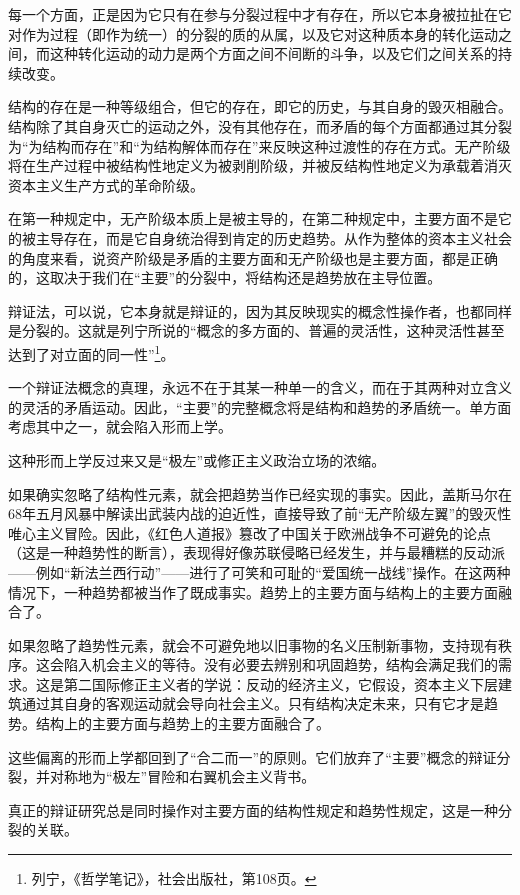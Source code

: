 \documentclass[fontset=fandol, a4paper, 12pt, twoside]{ctexart}
\begin{document}
每一个方面，正是因为它只有在参与分裂过程中才有存在，所以它本身被拉扯在它对作为过程（即作为统一）的分裂的质的从属，以及它对这种质本身的转化运动之间，而这种转化运动的动力是两个方面之间不间断的斗争，以及它们之间关系的持续改变。

结构的存在是一种等级组合，但它的存在，即它的历史，与其自身的毁灭相融合。结构除了其自身灭亡的运动之外，没有其他存在，而矛盾的每个方面都通过其分裂为“为结构而存在”和“为结构解体而存在”来反映这种过渡性的存在方式。无产阶级将在生产过程中被结构性地定义为被剥削阶级，并被反结构性地定义为承载着消灭资本主义生产方式的革命阶级。

在第一种规定中，无产阶级本质上是被主导的，在第二种规定中，主要方面不是它的被主导存在，而是它自身统治得到肯定的历史趋势。从作为整体的资本主义社会的角度来看，说资产阶级是矛盾的主要方面和无产阶级也是主要方面，都是正确的，这取决于我们在“主要”的分裂中，将结构还是趋势放在主导位置。

辩证法，可以说，它本身就是辩证的，因为其反映现实的概念性操作者，也都同样是分裂的。这就是列宁所说的“概念的多方面的、普遍的灵活性，这种灵活性甚至达到了对立面的同一性”\footnote{列宁，《哲学笔记》，社会出版社，第108页。}。

一个辩证法概念的真理，永远不在于其某一种单一的含义，而在于其两种对立含义的灵活的矛盾运动。因此，“主要”的完整概念将是结构和趋势的矛盾统一。单方面考虑其中之一，就会陷入形而上学。

这种形而上学反过来又是“极左”或修正主义政治立场的浓缩。

如果确实忽略了结构性元素，就会把趋势当作已经实现的事实。因此，盖斯马尔在68年五月风暴中解读出武装内战的迫近性，直接导致了前“无产阶级左翼”的毁灭性唯心主义冒险。因此，《红色人道报》篡改了中国关于欧洲战争不可避免的论点（这是一种趋势性的断言），表现得好像苏联侵略已经发生，并与最糟糕的反动派——例如“新法兰西行动”——进行了可笑和可耻的“爱国统一战线”操作。在这两种情况下，一种趋势都被当作了既成事实。趋势上的主要方面与结构上的主要方面融合了。

如果忽略了趋势性元素，就会不可避免地以旧事物的名义压制新事物，支持现有秩序。这会陷入机会主义的等待。没有必要去辨别和巩固趋势，结构会满足我们的需求。这是第二国际修正主义者的学说：反动的经济主义，它假设，资本主义下层建筑通过其自身的客观运动就会导向社会主义。只有结构决定未来，只有它才是趋势。结构上的主要方面与趋势上的主要方面融合了。

这些偏离的形而上学都回到了“合二而一”的原则。它们放弃了“主要”概念的辩证分裂，并对称地为“极左”冒险和右翼机会主义背书。

真正的辩证研究总是同时操作对主要方面的结构性规定和趋势性规定，这是一种分裂的关联。
\end{document}
